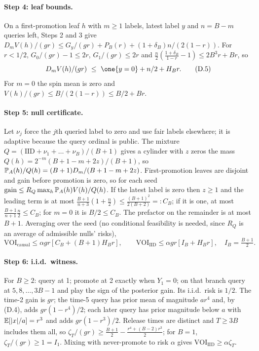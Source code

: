 \paragraph{Step 4: leaf bounds.} On a first-promotion leaf $h$ with $m\ge1$ labels, latest label $y$ and $n=B-m$ queries left, Steps 2 and 3 give $D_mV(h)/(gr)\le G_y/(gr)+P_B(r)+(1+\delta_B)n/(2(1-r))$. For $r<1/2$, $G_0/(gr)-1\le2r$, $G_1/(gr)\le2r$ and $\tfrac n2(\tfrac{1+\delta_B}{1-r}-1)\le2B^3r+Br$, so
\[
D_mV(h)/(gr)\ \le\ \one\{y=0\}+n/2+H_Br.
\tag{D.5}
\]
For $m=0$ the spin mean is zero and $V(h)/(gr)\le B/(2(1-r))\le B/2+Br$.

\paragraph{Step 5: null certificate.} Let $\nu_j$ force the $j$th queried label to zero and use fair labels elsewhere; it is adaptive because the query ordinal is public. The mixture $Q=(\mathrm{IID}+\nu_1+\dots+\nu_B)/(B+1)$ gives a cylinder with $z$ zeros the mass $Q(h)=2^{-m}(B+1-m+2z)/(B+1)$, so $\mathbb{P}_A(h)/Q(h)=(B+1)D_m/(B+1-m+2z)$. First-promotion leaves are disjoint and gain before promotion is zero, so for each seed $\mathrm{gain}\le R_Q\max_h\mathbb{P}_A(h)V(h)/Q(h)$. If the latest label is zero then $z\ge1$ and the leading term is at most $\frac{B+1}{n+3}(1+\frac n2)\le\frac{(B+1)^2}{2(B+2)}=:C_B$; if it is one, at most $\frac{B+1}{n+1}\frac n2\le C_B$; for $m=0$ it is $B/2\le C_B$. The prefactor on the remainder is at most $B+1$. Averaging over the seed (no conditional feasibility is needed, since $R_Q$ is an average of admissible nulls' risks),
\[
\mathrm{VOI}_{\mathrm{causal}}\le\alpha gr[C_B+(B+1)H_Br],\qquad \mathrm{VOI}_{\mathrm{IID}}\le\alpha gr[I_B+H_Br],\quad I_B=\tfrac{B+1}{2}.
\tag{D.6}
\]

\paragraph{Step 6: i.i.d.\ witness.} For $B\ge2$: query at 1; promote at 2 exactly when $Y_1=0$; on that branch query at $5,8,\dots,3B-1$ and play the sign of the posterior gain. Its i.i.d.\ risk is $1/2$. The time-2 gain is $gr$; the time-5 query has prior mean of magnitude $ar^4$ and, by (D.4), adds $gr(1-r^4)/2$; each later query has prior magnitude below $a$ with $\mathbb{E}[|x|/a]=r^3$ and adds $gr(1-r^3)/2$. Release times are distinct and $T\ge3B$ includes them all, so $\zeta_T/(gr)\ge\frac{B+1}{2}-\frac{r^4+(B-2)r^3}{2}$; for $B=1$, $\zeta_T/(gr)\ge1=I_1$. Mixing with never-promote to risk $\alpha$ gives $\mathrm{VOI}_{\mathrm{IID}}\ge\alpha\zeta_T$.

